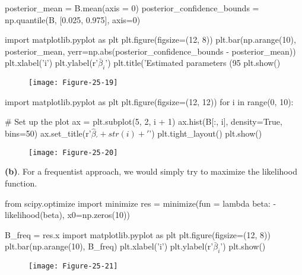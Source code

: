 \begin{python}
posterior_mean = B.mean(axis = 0)
posterior_confidence_bounds = np.quantile(B, [0.025, 0.975], axis=0)
\end{python}

\begin{python}
import matplotlib.pyplot as plt
plt.figure(figsize=(12, 8))
plt.bar(np.arange(10), posterior_mean, 
        yerr=np.abs(posterior_confidence_bounds - posterior_mean))
plt.xlabel('i')
plt.ylabel(r'$\bar{\beta}_{i}$')
plt.title('Estimated parameters (95%
plt.show()
\end{python}

\begin{figure}[H]
\centering
\texttt{[image: Figure-25-19]}
\end{figure}

\begin{python}
import matplotlib.pyplot as plt
plt.figure(figsize=(12, 12))
for i in range(0, 10):
    
    # Set up the plot
    ax = plt.subplot(5, 2, i + 1)
    ax.hist(B[:, i], density=True, bins=50)
    ax.set_title(r'$\hat{\beta}_' + str(i) + '$')
plt.tight_layout()
plt.show()
\end{python}

\begin{figure}[H]
\centering
\texttt{[image: Figure-25-20]}
\end{figure}

\textbf{(b)}. For a frequentist approach, we would simply try to
maximize the likelihood function.

\begin{python}
from scipy.optimize import minimize
res = minimize(fun = lambda beta: -likelihood(beta), x0=np.zeros(10))
\end{python}

\begin{python}
B_freq = res.x
import matplotlib.pyplot as plt
plt.figure(figsize=(12, 8))
plt.bar(np.arange(10), B_freq)
plt.xlabel('i')
plt.ylabel(r'$\bar{\beta}_{i}$')
plt.show()
\end{python}

\begin{figure}[H]
\centering
\texttt{[image: Figure-25-21]}
\end{figure}

